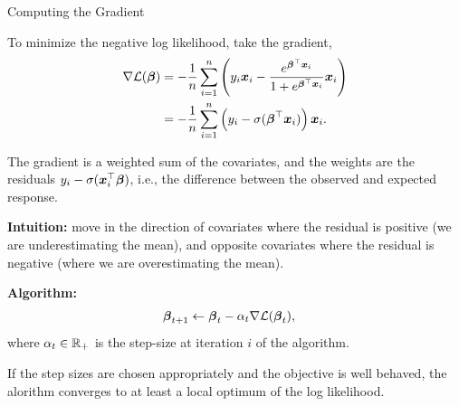 \documentclass[aspectratio=169]{beamer}
\begin{document}
\begin{frame}[t,allowframebreaks]{Computing the Gradient}\label{computing-the-gradient}

To minimize the negative log likelihood, take the gradient,
\begin{align*}
\nabla \mathcal{L}(\boldsymbol{\beta}) 
&= -\frac{1}{n} \sum_{i=1}^n \left(y_i \boldsymbol{x}_i - \frac{e^{\boldsymbol{\beta}^\top \boldsymbol{x}_i}}{1 + e^{\boldsymbol{\beta}^\top \boldsymbol{x}_i}} \boldsymbol{x}_i \right) \\
&= -\frac{1}{n}  \sum_{i=1}^n \left(y_i - \sigma(\boldsymbol{\beta}^\top \boldsymbol{x}_i) \right) \boldsymbol{x}_i.
\end{align*} 

The gradient is a weighted sum of the covariates, and
the weights are the residuals \(y_i - \sigma(\boldsymbol{x}_i^\top \boldsymbol{\beta})\),
i.e., the difference between the observed and expected response.

\textbf{Intuition:}  move in the direction of covariates where the residual
is positive (we are underestimating the mean), and opposite covariates where the residual is negative
(where we are overestimating the mean).

\textbf{Algorithm:}
\begin{align*}
\boldsymbol{\beta}_{t+1} &\leftarrow \boldsymbol{\beta}_t - \alpha_t \nabla \mathcal{L}(\boldsymbol{\beta}_t),
\end{align*} 
where \(\alpha_t \in \mathbb{R}_+\) is the step-size at
iteration \(i\) of the algorithm. 

If the step sizes are chosen
appropriately and the objective is well behaved, the alorithm converges
to at least a local optimum of the log likelihood.
\end{frame}
\end{document}
